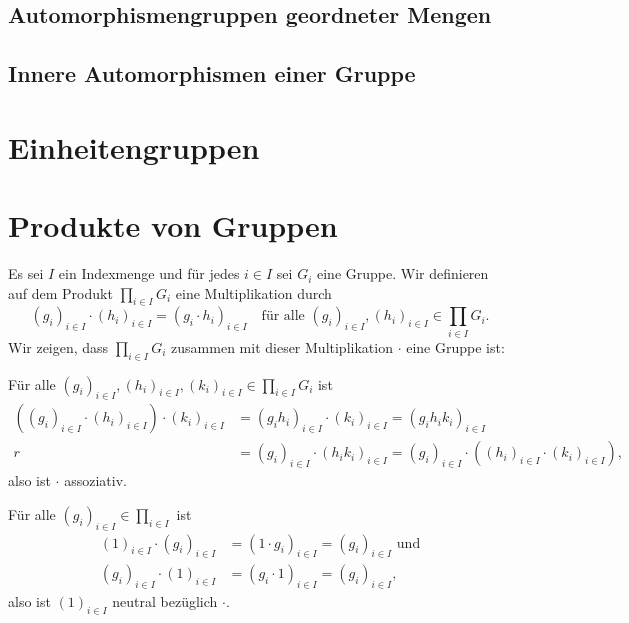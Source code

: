\subsection{Automorphismengruppen geordneter Mengen}


\subsection{Innere Automorphismen einer Gruppe}





\section{Einheitengruppen}





\section{Produkte von Gruppen}\label{sec: product of groups}

Es sei $I$ ein Indexmenge und für jedes $i \in I$ sei $G_i$ eine Gruppe. Wir definieren auf dem Produkt $\prod_{i \in I} G_i$ eine Multiplikation durch
\[
 (g_i)_{i \in I} \cdot (h_i)_{i \in I}
 = (g_i \cdot h_i)_{i \in I}
 \quad
 \text{für alle $(g_i)_{i \in I}, (h_i)_{i \in I} \in \prod_{i \in I} G_i$}.
\]
Wir zeigen, dass $\prod_{i \in I} G_i$ zusammen mit dieser Multiplikation $\cdot$ eine Gruppe ist:

Für alle $(g_i)_{i \in I}, (h_i)_{i \in I}, (k_i)_{i \in I} \in \prod_{i \in I} G_i$ ist
\begin{align*}
 ( (g_i)_{i \in I} \cdot (h_i)_{i \in I} ) \cdot (k_i)_{i \in I}
 &= (g_i h_i)_{i \in I} \cdot (k_i)_{i \in I}
 = (g_i h_i k_i)_{i \in I} \\r
 &= (g_i)_{i \in I} \cdot (h_i k_i)_{i \in I}
 = (g_i)_{i \in I} \cdot ( (h_i)_{i \in I} \cdot (k_i)_{i \in I} ),
\end{align*}
also ist $\cdot$ assoziativ.

Für alle $(g_i)_{i \in I} \in \prod_{i \in I}$ ist
\begin{align*}
 (1)_{i \in I} \cdot (g_i)_{i \in I}
 &= (1 \cdot g_i)_{i \in I}
 = (g_i)_{i \in I}
 \text{ und} \\
 (g_i)_{i \in I} \cdot (1)_{i \in I}
 &= (g_i \cdot 1)_{i \in I}
 = (g_i)_{i \in I},
\end{align*}
also ist $(1)_{i \in I}$ neutral bezüglich $\cdot$.

